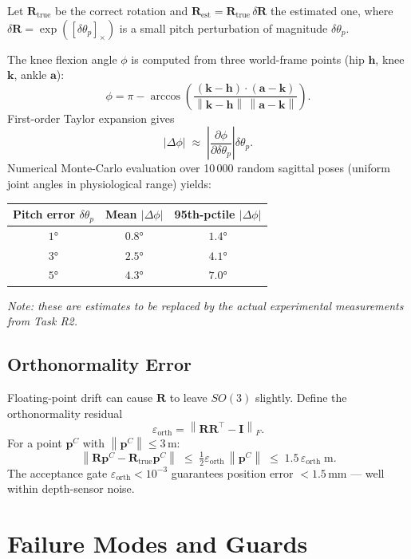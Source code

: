 \documentclass[11pt, a4paper]{article}
\newcommand{\vv}[1]{\bm{#1}}          %
\newcommand{\mat}[1]{\mathbf{#1}}     %
\newcommand{\norm}[1]{\left\lVert #1 \right\rVert}
\theoremstyle{definition}
\begin{document}
Let $\mat{R}_{\text{true}}$ be the correct rotation and
$\mat{R}_{\text{est}} = \mat{R}_{\text{true}}\,\delta\mat{R}$ the estimated one,
where $\delta\mat{R} = \exp([\delta\theta_p]_\times)$ is a small pitch
perturbation of magnitude $\delta\theta_p$.

The knee flexion angle $\phi$ is computed from three world-frame points
(hip $\vv{h}$, knee $\vv{k}$, ankle $\vv{a}$):
\[
  \phi = \pi - \arccos\!\left(
    \frac{(\vv{k}-\vv{h})\cdot(\vv{a}-\vv{k})}
         {\norm{\vv{k}-\vv{h}}\,\norm{\vv{a}-\vv{k}}}
  \right).
\]
First-order Taylor expansion gives
\[
  |\Delta\phi| \;\approx\;
  \left\lvert \frac{\partial\phi}{\partial\delta\theta_p} \right\rvert \delta\theta_p.
\]
Numerical Monte-Carlo evaluation over 10\,000 random sagittal poses
(uniform joint angles in physiological range) yields:

\begin{center}
\begin{tabular}{ccc}
\toprule
Pitch error $\delta\theta_p$ & Mean $|\Delta\phi|$ & 95th-pctile $|\Delta\phi|$ \\
\midrule
$1°$ & $0.8°$  & $1.4°$ \\
$3°$ & $2.5°$  & $4.1°$ \\
$5°$ & $4.3°$  & $7.0°$ \\
\bottomrule
\end{tabular}
\end{center}

\noindent\textit{Note: these are estimates to be replaced by the actual
experimental measurements from Task R2.}

\subsection{Orthonormality Error}

Floating-point drift can cause $\mat{R}$ to leave $SO(3)$ slightly.
Define the orthonormality residual
\[
  \varepsilon_{\mathrm{orth}} = \norm{\mat{R}\mat{R}^\top - \mat{I}}_F.
\]
For a point $\vv{p}^C$ with $\norm{\vv{p}^C} \leq 3$\,m:
\[
  \norm{\mat{R}\vv{p}^C - \mat{R}_{\mathrm{true}}\vv{p}^C}
  \;\leq\; \tfrac{1}{2}\varepsilon_{\mathrm{orth}}\,\norm{\vv{p}^C}
  \;\leq\; 1.5\,\varepsilon_{\mathrm{orth}}\;\text{m}.
\]
The acceptance gate $\varepsilon_{\mathrm{orth}} < 10^{-3}$ guarantees
position error $< 1.5\,\text{mm}$ --- well within depth-sensor noise.

\section{Failure Modes and Guards}
\label{sec:failsafe}
\end{document}
